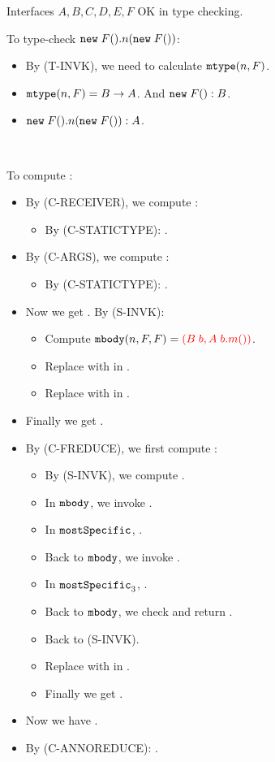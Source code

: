 Interfaces $A,B,C,D,E,F$ OK in type checking.

To type-check $\texttt{new} \; F().n(\texttt{new} \; F())$:
\begin{itemize}
	\item By (T-INVK), we need to calculate $\texttt{mtype}(n, F)$.
	\item $\texttt{mtype}(n, F) = B \to A$. And $\texttt{new} \; F() : B$.
	\item $\texttt{new} \; F().n(\texttt{new} \; F()) : A$.
\end{itemize}

~

To compute :
\begin{itemize}
	\item By (C-RECEIVER), we compute :
		\begin{itemize}
			\item By (C-STATICTYPE): .
		\end{itemize}
	\item By (C-ARGS), we compute :
		\begin{itemize}
			\item By (C-STATICTYPE): .
		\end{itemize}
	\item Now we get . By (S-INVK):
		\begin{itemize}
			\item Compute $\texttt{mbody}(n, F, F) = \textcolor{red}{(B \; b, A \; b.m())}$.
			\item Replace  with  in .
			\item Replace \red{$\kwthis$} with  in .
		\end{itemize}
	\item Finally we get .
	\item By (C-FREDUCE), we first compute :
		\begin{itemize}
			\item By (S-INVK), we compute .
			\item In $\texttt{mbody}$, we invoke .
			\item In $\texttt{mostSpecific}$, .
			\item Back to $\texttt{mbody}$, we invoke .
			\item In $\texttt{mostSpecific}_3$, .
			\item Back to $\texttt{mbody}$, we check  and return .
			\item Back to (S-INVK).
			\item Replace \red{$\kwthis$} with  in .
			\item Finally we get .
		\end{itemize}
	\item Now we have .
	\item By (C-ANNOREDUCE): .
\end{itemize}



